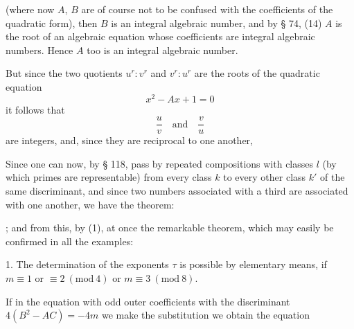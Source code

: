 (where now $A$, $B$ are of course not to be confused with the
coefficients of the quadratic form), then $B$ is an integral algebraic
number, and by § 74, (14) $A$ is the root of an algebraic equation whose
coefficients are integral algebraic numbers. Hence $A$ too is an integral
algebraic number.

But since the two quotients $u^r:v^r$ and $v^r:u^r$ are the roots of the
quadratic equation
\[
x^2 - Ax + 1 = 0
\]
it follows that
\[
\frac{u}{v} \quad \text{and} \quad \frac{v}{u}
\]
are integers, and, since they are reciprocal to one another, 


Since one can now, by § 118, pass by repeated compositions with classes
$l$ (by which primes are representable) from every class $k$ to every other
class $k'$ of the same discriminant, and since two numbers associated with
a third are associated with one another, we have the theorem:

; and from this, by (1), at
once the remarkable theorem, which may easily be confirmed in all the
examples:


1. The determination of the exponents $\tau$ is possible by
elementary means, if $m \equiv 1$ or $\equiv 2\ (\mathrm{mod}\ 4)$
or $m \equiv 3\ (\mathrm{mod}\ 8)$.

If in the equation with odd outer coefficients
with the discriminant $4(B^2 - AC) = -4m$ we make the substitution
we obtain the equation
